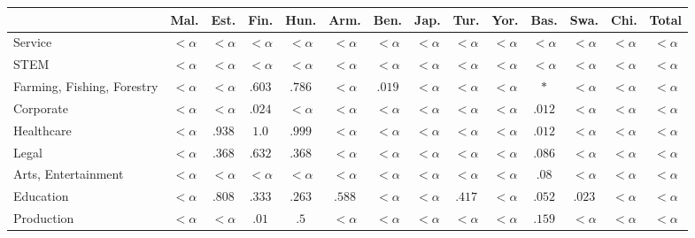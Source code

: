 \documentclass[fleqn,10pt]{article}
\begin{document}
\begin{table}[H]
\small
\begin{tabular}{|m{1.75cm}|cccccccccccc|c|}
\hline
& Mal. & Est. & Fin. & Hun. & Arm. & Ben. & Jap. & Tur. & Yor. & Bas. & Swa. & Chi. & Total \\ \hline
Service & $<\alpha$ & $<\alpha$ & $<\alpha$ & $<\alpha$ & $<\alpha$ & $<\alpha$ & $<\alpha$ & $<\alpha$ & $<\alpha$ & $<\alpha$ & $<\alpha$ & $<\alpha$ & $<\alpha$  \\ \cline{1-1}
STEM & $<\alpha$ & $<\alpha$ & $<\alpha$ & $<\alpha$ & $<\alpha$ & $<\alpha$ & $<\alpha$ & $<\alpha$ & $<\alpha$ & $<\alpha$ & $<\alpha$ & $<\alpha$ & $<\alpha$  \\ \cline{1-1} 
Farming, Fishing, Forestry & $<\alpha$ & $<\alpha$ & \cellcolor{blue!25}$.603$ & \cellcolor{blue!25}$.786$ & $<\alpha$ & \cellcolor{blue!25}$.019$ & $<\alpha$ & $<\alpha$ & $<\alpha$ & $*$ & $<\alpha$ & $<\alpha$ & $<\alpha$  \\ \cline{1-1} 
Corporate & $<\alpha$ & $<\alpha$ & \cellcolor{blue!25}$.024$ & $<\alpha$ & $<\alpha$ & $<\alpha$ & $<\alpha$ & $<\alpha$ & $<\alpha$ & \cellcolor{blue!25}$.012$ & $<\alpha$ & $<\alpha$ & $<\alpha$  \\ \cline{1-1} 
Healthcare & $<\alpha$ & \cellcolor{blue!25}$.938$ & \cellcolor{blue!25}$1.0$ & \cellcolor{blue!25}$.999$ & $<\alpha$ & $<\alpha$ & $<\alpha$ & $<\alpha$ & $<\alpha$ & \cellcolor{blue!25}$.012$ & $<\alpha$ & $<\alpha$ & $<\alpha$  \\ \cline{1-1} 
Legal & $<\alpha$ & \cellcolor{blue!25}$.368$ & \cellcolor{blue!25}$.632$ & \cellcolor{blue!25}$.368$ & $<\alpha$ & $<\alpha$ & $<\alpha$ & $<\alpha$ & $<\alpha$ & \cellcolor{blue!25}$.086$ & $<\alpha$ & $<\alpha$ & $<\alpha$  \\ \cline{1-1} 
Arts, Entertainment & $<\alpha$ & $<\alpha$ & $<\alpha$ & $<\alpha$ & $<\alpha$ & $<\alpha$ & $<\alpha$ & $<\alpha$ & $<\alpha$ & \cellcolor{blue!25}$.08$ & $<\alpha$ & $<\alpha$ & $<\alpha$  \\ \cline{1-1} 
Education & $<\alpha$ & \cellcolor{blue!25}$.808$ & \cellcolor{blue!25}$.333$ & \cellcolor{blue!25}$.263$ & \cellcolor{blue!25}$.588$ & $<\alpha$ & $<\alpha$ & \cellcolor{blue!25}$.417$ & $<\alpha$ & \cellcolor{blue!25}$.052$ & \cellcolor{blue!25}$.023$ & $<\alpha$ & $<\alpha$  \\ \cline{1-1} 
Production & $<\alpha$ & $<\alpha$ & \cellcolor{blue!25}$.01$ & \cellcolor{blue!25}$.5$ & $<\alpha$ & $<\alpha$ & $<\alpha$ & $<\alpha$ & $<\alpha$ & \cellcolor{blue!25}$.159$ & $<\alpha$ & $<\alpha$ & $<\alpha$  \\ \cline{1-1} 

\end{tabular}
\end{table}
\end{document}
